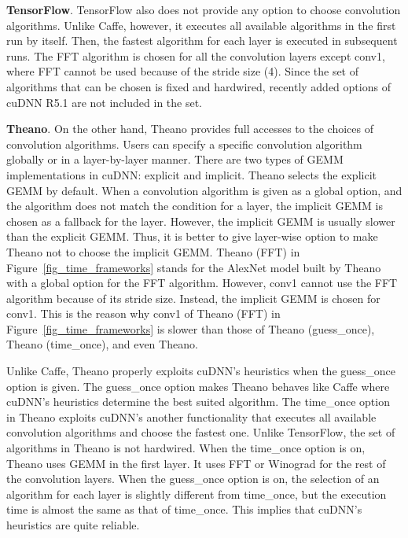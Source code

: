 {\bf TensorFlow}. TensorFlow also does not provide any option to choose convolution algorithms. Unlike Caffe, however, it executes all available algorithms in the first run by itself. Then, the fastest algorithm for each layer is executed in subsequent runs. The FFT algorithm is chosen for all the convolution layers except \textsf{conv1}, where FFT cannot be used because of the stride size (4). Since the set of algorithms that can be chosen is fixed and hardwired, recently added options of cuDNN R5.1 are not included in the set.

{\bf Theano}. On the other hand, Theano provides full accesses to the choices of convolution algorithms. Users can specify a specific convolution algorithm globally or in a layer-by-layer manner. There are two types of GEMM implementations in cuDNN: explicit and implicit. Theano selects the explicit GEMM by default. When a convolution algorithm is given as a global option, and the algorithm does not match the condition for a layer, the implicit GEMM is chosen as a fallback for the layer. However, the implicit GEMM is usually slower than the explicit GEMM. Thus, it is better to give layer-wise option to make Theano not to choose the implicit GEMM. \textsf{Theano (FFT)} in Figure~\ref{fig_time_frameworks} stands for the AlexNet model built by Theano with a global option for the FFT algorithm. However, \textsf{conv1} cannot use the FFT algorithm because of its stride size. Instead, the implicit GEMM is chosen for \textsf{conv1}. This is the reason why \textsf{conv1} of \textsf{Theano (FFT)} in Figure~\ref{fig_time_frameworks} is slower than those of \textsf{Theano (guess\_once)}, \textsf{Theano (time\_once)}, and even \textsf{Theano}. 

Unlike Caffe, Theano properly exploits cuDNN's heuristics when the \textsf{guess\_once} option is given. The \textsf{guess\_once} option makes Theano behaves like Caffe where cuDNN's heuristics determine the best suited algorithm. The \textsf{time\_once} option in Theano exploits cuDNN's another functionality that executes all available convolution algorithms and choose the fastest one. Unlike TensorFlow, the set of algorithms in Theano is not hardwired. When the \textsf{time\_once} option is on, Theano uses GEMM in the first layer. It uses FFT or Winograd for the rest of the convolution layers. When the \textsf{guess\_once} option is on, the selection of an algorithm for each layer is slightly different from \textsf{time\_once}, but the execution time is almost the same as that of \textsf{time\_once}. This implies that cuDNN's heuristics are quite reliable.

